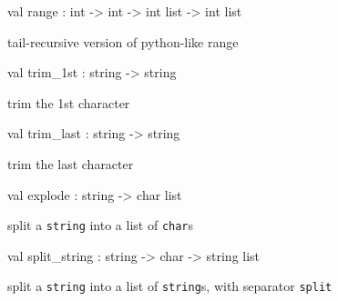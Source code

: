 \documentclass[11pt]{article}
\begin{document}
\label{val:Util.range}\begin{ocamldoccode}
val range : int -> int -> int list -> int list
\end{ocamldoccode}
\begin{ocamldocdescription}
tail-recursive version of python-like range


\end{ocamldocdescription}




\label{val:Util.trim-underscore1st}\begin{ocamldoccode}
val trim_1st : string -> string
\end{ocamldoccode}
\begin{ocamldocdescription}
trim the 1st character


\end{ocamldocdescription}




\label{val:Util.trim-underscorelast}\begin{ocamldoccode}
val trim_last : string -> string
\end{ocamldoccode}
\begin{ocamldocdescription}
trim the last character


\end{ocamldocdescription}




\label{val:Util.explode}\begin{ocamldoccode}
val explode : string -> char list
\end{ocamldoccode}
\begin{ocamldocdescription}
split a {\tt{string}} into a list of {\tt{char}}s


\end{ocamldocdescription}




\label{val:Util.split-underscorestring}\begin{ocamldoccode}
val split_string : string -> char -> string list
\end{ocamldoccode}
\begin{ocamldocdescription}
split a {\tt{string}} into a list of {\tt{string}}s, with separator {\tt{split}}


\end{ocamldocdescription}
\end{document}
